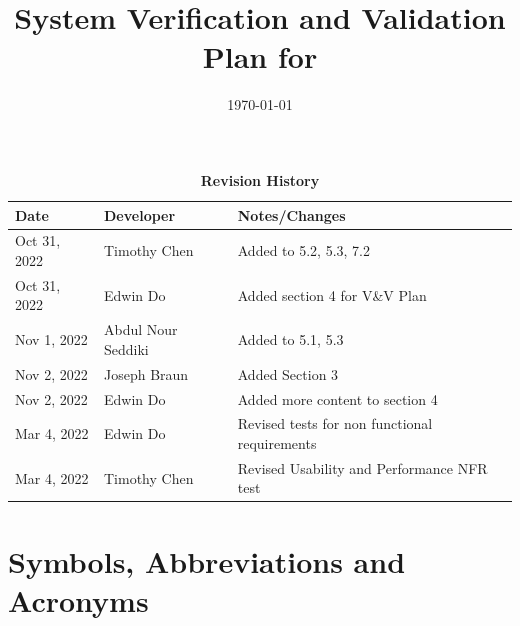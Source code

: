 \documentclass[12pt, titlepage]{article}
\begin{document}
\title{System Verification and Validation Plan for \progname{}} 
\author{\authname}
\date{\today}
	
\maketitle


\begin{table}[H]
  \caption{\bf Revision History}
  \begin{tabularx}{\textwidth}{p{2.5cm}p{2.5cm}X}
  \toprule {\bf Date} & {\bf Developer} & {\bf Notes/Changes}\\
  \midrule
  Oct 31, 2022 & Timothy Chen & Added to 5.2, 5.3, 7.2\\
  Oct 31, 2022 & Edwin Do & Added section 4 for V\&V Plan\\
  Nov 1, 2022 & Abdul Nour Seddiki & Added to 5.1, 5.3\\
  Nov 2, 2022 & Joseph Braun & Added Section 3\\
  Nov 2, 2022 & Edwin Do & Added more content to section 4 \\
  Mar 4, 2022 & Edwin Do & Revised tests for non functional requirements\\
  Mar 4, 2022 & Timothy Chen & Revised Usability and Performance NFR test\\
  \bottomrule
  \end{tabularx}
  \end{table}
  

\newpage

\tableofcontents

\listoftables
{}

\listoffigures
{}

\newpage

\section{Symbols, Abbreviations and Acronyms}
\end{document}
